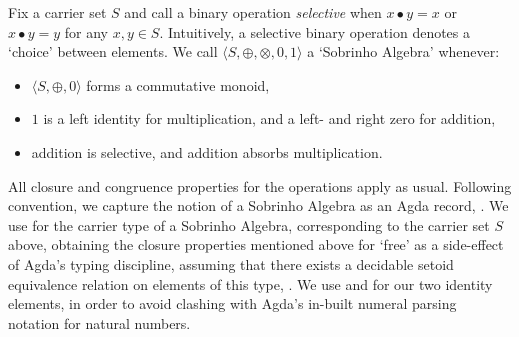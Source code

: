 Fix a carrier set $S$ and call a binary operation \emph{selective} when $x \bullet y = x$ or $x \bullet y = y$ for any $x, y \in S$.
Intuitively, a selective binary operation denotes a `choice' between elements.
We call $\langle S, \oplus, \otimes, 0, 1 \rangle$ a `Sobrinho Algebra' whenever:
\begin{itemize}
\item
$\langle S, \oplus, 0 \rangle$ forms a commutative monoid,
\item
$1$ is a left identity for multiplication, and a left- and right zero for addition,
\item
addition is selective, and addition absorbs multiplication.
\end{itemize}
All closure and congruence properties for the operations apply as usual.
Following convention, we capture the notion of a Sobrinho Algebra as an Agda record, .
We use  for the carrier type of a Sobrinho Algebra, corresponding to the carrier set $S$ above, obtaining the closure properties mentioned above for `free' as a side-effect of Agda's typing discipline, assuming that there exists a decidable setoid equivalence relation on elements of this type, .
We use  and  for our two identity elements, in order to avoid clashing with Agda's in-built numeral parsing notation for natural numbers.

